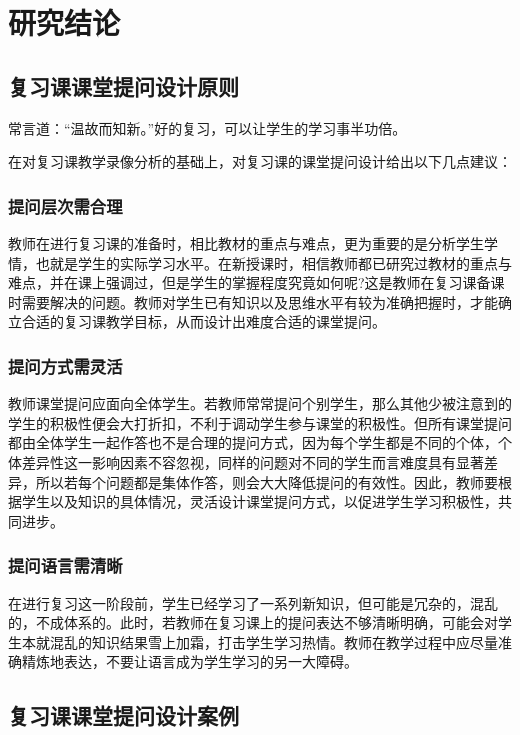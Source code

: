 \chapter{研究结论}


\section{复习课课堂提问设计原则}

常言道：“温故而知新。”好的复习，可以让学生的学习事半功倍。

在对复习课教学录像分析的基础上，对复习课的课堂提问设计给出以下几点建议：


\subsection{提问层次需合理}

教师在进行复习课的准备时，相比教材的重点与难点，更为重要的是分析学生学情，也就是学生的实际学习水平。在新授课时，相信教师都已研究过教材的重点与难点，并在课上强调过，但是学生的掌握程度究竟如何呢?这是教师在复习课备课时需要解决的问题。教师对学生已有知识以及思维水平有较为准确把握时，才能确立合适的复习课教学目标，从而设计出难度合适的课堂提问。


\subsection{提问方式需灵活}

教师课堂提问应面向全体学生。若教师常常提问个别学生，那么其他少被注意到的学生的积极性便会大打折扣，不利于调动学生参与课堂的积极性。但所有课堂提问都由全体学生一起作答也不是合理的提问方式，因为每个学生都是不同的个体，个体差异性这一影响因素不容忽视，同样的问题对不同的学生而言难度具有显著差异，所以若每个问题都是集体作答，则会大大降低提问的有效性。因此，教师要根据学生以及知识的具体情况，灵活设计课堂提问方式，以促进学生学习积极性，共同进步。


\subsection{提问语言需清晰}

在进行复习这一阶段前，学生已经学习了一系列新知识，但可能是冗杂的，混乱的，不成体系的。此时，若教师在复习课上的提问表达不够清晰明确，可能会对学生本就混乱的知识结果雪上加霜，打击学生学习热情。教师在教学过程中应尽量准确精炼地表达，不要让语言成为学生学习的另一大障碍。



\section{复习课课堂提问设计案例}


